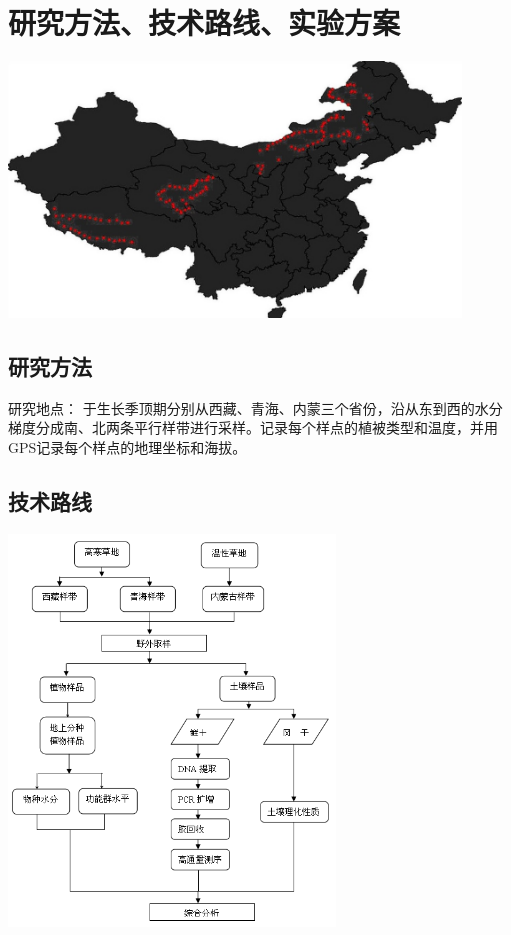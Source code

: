 \section{研究方法、技术路线、实验方案}
\begin{frame}{\insertsection}
	\begin{center}
		\includegraphics[width = 0.9\textwidth]{./研究方法.jpg}
	\end{center}
\end{frame}

\subsection{研究方法}
\begin{frame}{\insertsection}{\insertsubsection}
	研究地点：
	于生长季顶期分别从西藏、青海、内蒙三个省份，沿从东到西的水分梯度分成南、北两条平行样带进行采样。记录每个样点的植被类型和温度，并用GPS记录每个样点的地理坐标和海拔。
\end{frame}
\subsection{技术路线}
\begin{frame}{\insertsection}{\insertsubsection}
	\begin{center}
		\includegraphics[width = 0.65\textwidth]{./技术路线.jpg}
	\end{center}
\end{frame}

